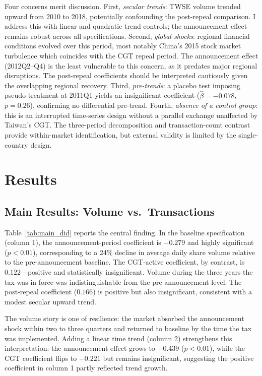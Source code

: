 \documentclass[12pt]{article}
\begin{document}
Four concerns merit discussion. First, \emph{secular trends}: TWSE volume trended upward from 2010 to 2018, potentially confounding the post-repeal comparison. I address this with linear and quadratic trend controls; the announcement effect remains robust across all specifications. Second, \emph{global shocks}: regional financial conditions evolved over this period, most notably China's 2015 stock market turbulence which coincides with the CGT repeal period. The announcement effect (2012Q2--Q4) is the least vulnerable to this concern, as it predates major regional disruptions. The post-repeal coefficients should be interpreted cautiously given the overlapping regional recovery. Third, \emph{pre-trends}: a placebo test imposing pseudo-treatment at 2011Q1 yields an insignificant coefficient ($\hat{\beta} = -0.078$, $p = 0.26$), confirming no differential pre-trend. Fourth, \emph{absence of a control group}: this is an interrupted time-series design without a parallel exchange unaffected by Taiwan's CGT. The three-period decomposition and transaction-count contrast provide within-market identification, but external validity is limited by the single-country design.


\section{Results}

\subsection{Main Results: Volume vs.~Transactions}



Table~\ref{tab:main_did} reports the central finding. In the baseline specification (column 1), the announcement-period coefficient is $-0.279$ and highly significant ($p < 0.01$), corresponding to a 24\% decline in average daily share volume relative to the pre-announcement baseline. The CGT-active coefficient, by contrast, is $0.122$---positive and statistically insignificant. Volume during the three years the tax was in force was indistinguishable from the pre-announcement level. The post-repeal coefficient ($0.166$) is positive but also insignificant, consistent with a modest secular upward trend.

The volume story is one of resilience: the market absorbed the announcement shock within two to three quarters and returned to baseline by the time the tax was implemented. Adding a linear time trend (column 2) strengthens this interpretation: the announcement effect grows to $-0.439$ ($p < 0.01$), while the CGT coefficient flips to $-0.221$ but remains insignificant, suggesting the positive coefficient in column 1 partly reflected trend growth.
\end{document}

